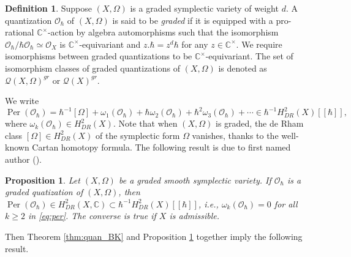 \documentclass[12pt]{amsart}
\newcommand{\C}{\mathbb{C}}
\newcommand{\quan}{\mathcal{Q}}
\newcommand{\per}{\operatorname{Per}}
\newcommand{\cm}{\C^\times}
\newcommand{\OO}{\mathcal{O}}
\newtheorem{Prop}[Thm]{Proposition}
\theoremstyle{definition}
\newtheorem{defi}[Thm]{Definition}
\numberwithin{equation}{section}
\begin{document}
\begin{defi}\label{defn:graded_quan}
	Suppose $(X, \Omega)$ is a graded symplectic variety of weight $d$. A quantization $\OO_\hbar$ of $(X,\Omega)$  is said to be \emph{graded} if it is equipped with a pro-rational  $\cm$-action by algebra automorphisms such that the isomorphism $\OO_\hbar / \hbar \OO_\hbar \simeq \OO_X$ is $\cm$-equivariant and $z. \hbar = z^d \hbar$ for any $z \in \cm$. We require isomorphisms between graded quantizations to be $\cm$-equivariant. The set of isomorphism classes of graded quantizations of $(X,\Omega)$ is denoted as $\quan(X, \Omega)^{gr}$ or $\quan(X)^{gr}$.
\end{defi}

We write
\begin{equation} \label{eq:per}
	\per(\OO_\hbar) =  \hbar^{-1}[\Omega] + \omega_1(\OO_\hbar) +  \hbar \omega_2(\OO_\hbar)+  \hbar^2 \omega_3 (\OO_\hbar)+ \cdots \in  \hbar^{-1}H^2_{DR}(X)[[\hbar]],
\end{equation}
where $\omega_k(\OO_\hbar) \in H^2_{DR}(X)$. Note that when $(X, \Omega)$ is graded, the de Rham class $[\Omega] \in H^2_{DR}(X)$ of the symplectic form $\Omega$ vanishes, thanks to the well-known Cartan homotopy formula. The following result is due to first named author (\cite[Section 2.2 and Prop. 2.3.2]{quant_iso}).

\begin{Prop}\label{prop:graded}
	Let $(X,\Omega)$ be a graded smooth symplectic variety.%
		If $\OO_\hbar$ is a graded quatization of $(X, \Omega)$, then $\per(\OO_\hbar) \in H^2_{DR}(X, \C) \subset  \hbar^{-1}H^2_{DR}(X)[[\hbar]]$, i.e., $\omega_k(\OO_\hbar) = 0$ for all $k \geqslant 2$ in \eqref{eq:per}.
The converse is true if $X$ is admissible.
\end{Prop}

Then Theorem \ref{thm:quan_BK} and Proposition \ref{prop:graded} together imply the following result.
\end{document}
